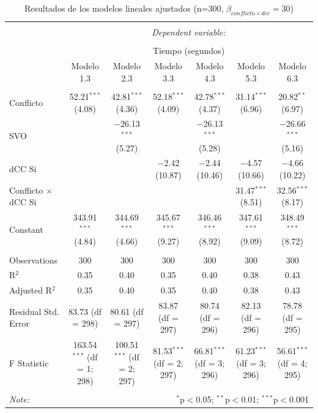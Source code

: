 \documentclass[
  spanish,
  10pt,
]{article}
\begin{document}
\begin{table}[H] \centering 
  \caption{Resultados de los modelos lineales ajustados (n=300, $\beta_{conflicto \times dcc} = 30$)} 
  \label{} 
\tiny 
\begin{tabular}{@{\extracolsep{5pt}}lcccccc} 
\\[-1.8ex]\hline 
\hline \\[-1.8ex] 
 & \multicolumn{6}{c}{\textit{Dependent variable:}} \\ 
\cline{2-7} 
\\[-1.8ex] & \multicolumn{6}{c}{Tiempo (segundos)} \\ 
 & Modelo 1.3 & Modelo 2.3 & Modelo 3.3 & Modelo 4.3 & Modelo 5.3 & Modelo 6.3 \\ 
\hline \\[-1.8ex] 
 Conflicto & 52.21$^{***}$ (4.08) & 42.81$^{***}$ (4.36) & 52.18$^{***}$ (4.09) & 42.78$^{***}$ (4.37) & 31.14$^{***}$ (6.96) & 20.82$^{**}$ (6.97) \\ 
  SVO &  & $-$26.13$^{***}$ (5.27) &  & $-$26.13$^{***}$ (5.28) &  & $-$26.66$^{***}$ (5.16) \\ 
  dCC Si &  &  & $-$2.42 (10.87) & $-$2.44 (10.46) & $-$4.57 (10.66) & $-$4.66 (10.22) \\ 
  Conflicto $\times$ dCC Si &  &  &  &  & 31.47$^{***}$ (8.51) & 32.56$^{***}$ (8.17) \\ 
  Constant & 343.91$^{***}$ (4.84) & 344.69$^{***}$ (4.66) & 345.67$^{***}$ (9.27) & 346.46$^{***}$ (8.92) & 347.61$^{***}$ (9.09) & 348.49$^{***}$ (8.72) \\ 
 \hline \\[-1.8ex] 
Observations & 300 & 300 & 300 & 300 & 300 & 300 \\ 
R$^{2}$ & 0.35 & 0.40 & 0.35 & 0.40 & 0.38 & 0.43 \\ 
Adjusted R$^{2}$ & 0.35 & 0.40 & 0.35 & 0.40 & 0.38 & 0.43 \\ 
Residual Std. Error & 83.73 (df = 298) & 80.61 (df = 297) & 83.87 (df = 297) & 80.74 (df = 296) & 82.13 (df = 296) & 78.78 (df = 295) \\ 
F Statistic & 163.54$^{***}$ (df = 1; 298) & 100.51$^{***}$ (df = 2; 297) & 81.53$^{***}$ (df = 2; 297) & 66.81$^{***}$ (df = 3; 296) & 61.23$^{***}$ (df = 3; 296) & 56.61$^{***}$ (df = 4; 295) \\ 
\hline 
\hline \\[-1.8ex] 
\textit{Note:}  & \multicolumn{6}{r}{$^{*}$p$<$0.05; $^{**}$p$<$0.01; $^{***}$p$<$0.001} \\ 
\end{tabular} 
\end{table}
\end{document}
